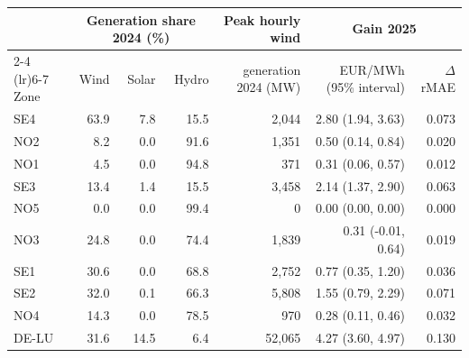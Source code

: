 \begin{tabular}{lrrrrrr}
\toprule
 & \multicolumn{3}{c}{Generation share 2024 (\%)} & Peak hourly wind & \multicolumn{2}{c}{Gain 2025} \\
\cmidrule(lr){2-4} \cmidrule(lr){6-7}
Zone & Wind & Solar & Hydro & generation 2024 (MW) & EUR/MWh (95\% interval) & $\Delta$rMAE \\
\midrule
SE4 & 63.9 & 7.8 & 15.5 & 2,044 & 2.80 (1.94, 3.63) & 0.073 \\
NO2 & 8.2 & 0.0 & 91.6 & 1,351 & 0.50 (0.14, 0.84) & 0.020 \\
NO1 & 4.5 & 0.0 & 94.8 & 371 & 0.31 (0.06, 0.57) & 0.012 \\
SE3 & 13.4 & 1.4 & 15.5 & 3,458 & 2.14 (1.37, 2.90) & 0.063 \\
NO5 & 0.0 & 0.0 & 99.4 & 0 & 0.00 (0.00, 0.00) & 0.000 \\
NO3 & 24.8 & 0.0 & 74.4 & 1,839 & 0.31 (-0.01, 0.64) & 0.019 \\
SE1 & 30.6 & 0.0 & 68.8 & 2,752 & 0.77 (0.35, 1.20) & 0.036 \\
SE2 & 32.0 & 0.1 & 66.3 & 5,808 & 1.55 (0.79, 2.29) & 0.071 \\
NO4 & 14.3 & 0.0 & 78.5 & 970 & 0.28 (0.11, 0.46) & 0.032 \\
DE-LU & 31.6 & 14.5 & 6.4 & 52,065 & 4.27 (3.60, 4.97) & 0.130 \\
\bottomrule
\end{tabular}
